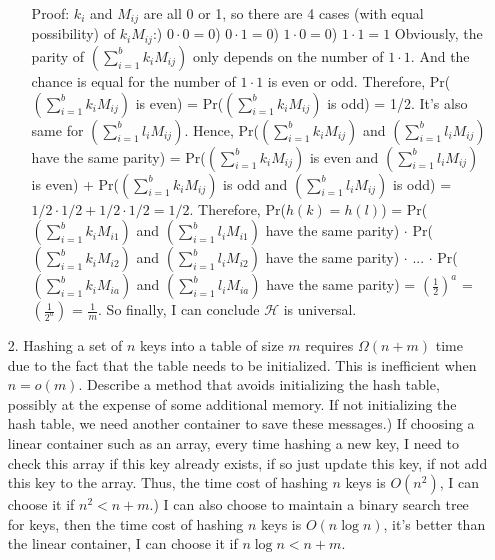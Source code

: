 \documentclass{article}       %
\begin{document}
\begin{enumerate}
\begin{enumerate}
		Proof: $k_i$ and $M_{ij}$ are all 0 or 1, so there are 4 cases (with equal possibility) of $k_iM_{ij}$:) $0\cdot 0 = 0$) $0\cdot 1 = 0$) $1\cdot 0 = 0$) $1\cdot 1 = 1$\newline
		Obviously, the parity of $(\sum_{i=1}^{b} k_iM_{ij})$ only depends on the number of $1\cdot 1$. And the chance is equal for the number of $1\cdot 1$ is even or odd. Therefore, Pr($(\sum_{i=1}^{b} k_iM_{ij})$ is even) = Pr($(\sum_{i=1}^{b} k_iM_{ij})$ is odd) = 1/2. It's also same for $(\sum_{i=1}^{b} l_iM_{ij})$.\newline
		Hence, Pr($(\sum_{i=1}^{b} k_iM_{ij})$ and  $(\sum_{i=1}^{b} l_iM_{ij})$ have the same parity) = Pr($(\sum_{i=1}^{b} k_iM_{ij})$ is even and  $(\sum_{i=1}^{b} l_iM_{ij})$ is even) + Pr($(\sum_{i=1}^{b} k_iM_{ij})$ is odd and  $(\sum_{i=1}^{b} l_iM_{ij})$ is odd) = $1/2 \cdot 1/2 + 1/2 \cdot 1/2 = 1/2$.\newline
		Therefore, Pr($h(k) = h(l)$) = Pr($(\sum_{i=1}^{b} k_iM_{i1})$ and  $(\sum_{i=1}^{b} l_iM_{i1})$ have the same parity) $\cdot$ Pr($(\sum_{i=1}^{b} k_iM_{i2})$ and  $(\sum_{i=1}^{b} l_iM_{i2})$ have the same parity) $\cdot$ ... $\cdot$ Pr($(\sum_{i=1}^{b} k_iM_{ia})$ and  $(\sum_{i=1}^{b} l_iM_{ia})$ have the same parity) = $(\frac{1}{2})^a$ = $(\frac{1}{2^a})$ = $\frac{1}{m}$. So finally, I can conclude $\mathcal{H}$ is universal.\newline
	\end{enumerate}
	\item[2.] Hashing a set of $n$ keys into a table of size $m$ requires $\Omega (n+m)$ time due to the fact that the table needs to be initialized. This is inefficient when $n=o(m)$. Describe a method that avoids initializing the hash table, possibly at the expense of some additional memory.\newline\newline
	If not initializing the hash table, we need another container to save these messages.) If choosing a linear container such as an array, every time hashing a new key, I need to check this array if this key already exists, if so just update this key, if not add this key to the array. Thus, the time cost of hashing $n$ keys is $O(n^2)$, I can choose it if $n^2 < n+m$.) I can also choose to maintain a binary search tree for keys, then the time cost of hashing $n$ keys is $O(n\log n)$, it's better than the linear container, I can choose it if $n\log n < n+m$.\newline

\end{enumerate}
\end{document}
